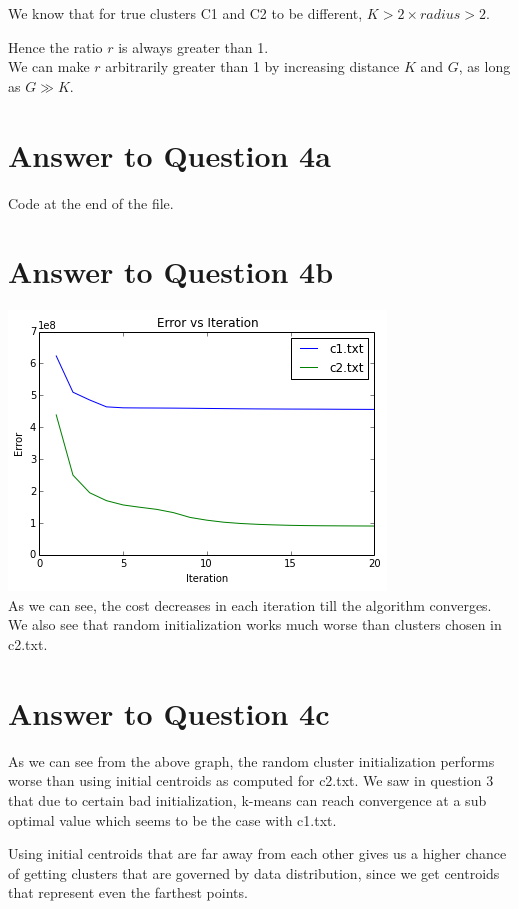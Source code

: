 \documentclass[11pt]{article}
\begin{document}
{We know that for true clusters C1 and C2 to be different, $K > 2 \times radius > 2$.

Hence the ratio $r$ is always greater than 1.\\

We can make $r$ arbitrarily greater than 1 by increasing distance $K$ and $G$, as long as $G \gg K$.

\pagebreak[4]
\section*{Answer to Question 4a}
Code at the end of the file.

\pagebreak[4]
\section*{Answer to Question 4b}
\includegraphics*{q4err}\\
As we can see, the cost decreases in each iteration till the algorithm converges. We also see that random initialization works much worse than clusters chosen in c2.txt.

\pagebreak[4]
\section*{Answer to Question 4c}
As we can see from the above graph, the random cluster initialization performs worse than using initial centroids as computed for c2.txt. We saw in question 3 that due to certain bad initialization, k-means can reach convergence at a sub optimal value which seems to be the case with c1.txt. 

Using initial centroids that are far away from each other gives us a higher chance of getting clusters that are governed by data distribution, since we get centroids that represent even the farthest points.\\

}
\end{document}
